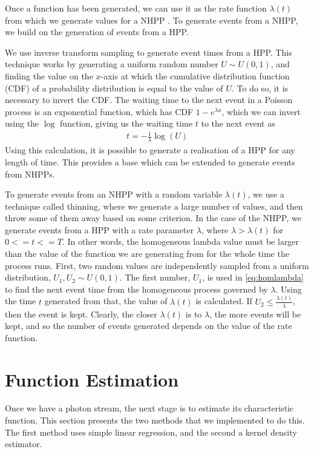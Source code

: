 \documentclass[a4paper,11pt]{article}
\begin{document}
   Once a function has been generated, we can use it as the rate function
   $\lambda(t)$ from which we generate values for a NHPP . To generate events
   from a NHPP, we build on the generation of events from a HPP.

   We use inverse transform sampling to generate event times from a HPP. This
   technique works by generating a uniform random number $U\sim U(0,1)$, and
   finding the value on the $x$-axis at which the cumulative distribution
   function (CDF) of a probability distribution is equal to the value of $U$. To
   do so, it is necessary to invert the CDF. The waiting time to the next event
   in a Poisson process is an exponential function, which has CDF $1-e^{\lambda
   x}$, which we can invert using the $\log$ function, giving us the
   waiting time $t$ to the next event as \cite{1998art}
   \begin{align}\label{eq:homlambda}
   t=-\frac{1}{\lambda}\log(U)
   \end{align}
   Using this calculation, it is possible to generate a realisation of a HPP for
   any length of time. This provides a base which can be extended to generate
   events from NHPPs.
   
   To generate events from an NHPP with a random variable $\lambda(t)$, we use a
   technique called thinning, where we generate a large number of values, and
   then throw some of them away based on some criterion. In the case of the
   NHPP, we generate events from a HPP with a rate parameter $\lambda$, where
   $\lambda>\lambda(t)$ for $0<=t<=T$. In other words, the homogeneous lambda
   value must be larger than the value of the function we are generating from
   for the whole time the process runs. First, two random values are
   independently sampled from a uniform distribution, $U_1,U_2\sim U(0,1)$. The
   first number, $U_1$, is used in \eqref{eq:homlambda} to find the next event
   time from the homogeneous process governed by $\lambda$. Using the time $t$
   generated from that, the value of $\lambda(t)$ is calculated. If
   $U_2\leq\frac{\lambda(t)}{\lambda}$, then the event is kept. Clearly, the closer
   $\lambda(t)$ is to $\lambda$, the more events will be kept, and so the number
   of events generated depends on the value of the rate function.
\section{Function Estimation}
\label{sec-4}

  Once we have a photon stream, the next stage is to estimate its characteristic
  function. This section presents the two methods that we implemented to do
  this. The first method uses simple linear regression, and the second a kernel
  density estimator.
\end{document}
